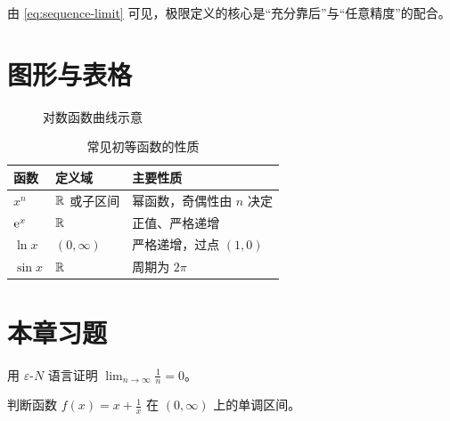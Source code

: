 由 \cref{eq:sequence-limit} 可见，极限定义的核心是“充分靠后”与“任意精度”的配合。

\section{图形与表格}

\begin{figure}[htbp]
  \centering
  \caption{对数函数曲线示意}
  \label{fig:log-curve}
\end{figure}

\begin{table}[htbp]
  \centering
  \caption{常见初等函数的性质}
  \label{tab:functions}
  \begin{tabular}{lll}
    \toprule
    函数 & 定义域 & 主要性质 \\
    \midrule
    $x^n$ & $\mathbb{R}$ 或子区间 & 幂函数，奇偶性由 $n$ 决定 \\
    $\mathrm{e}^x$ & $\mathbb{R}$ & 正值、严格递增 \\
    $\ln x$ & $(0,\infty)$ & 严格递增，过点 $(1,0)$ \\
    $\sin x$ & $\mathbb{R}$ & 周期为 $2\pi$ \\
    \bottomrule
  \end{tabular}
\end{table}

\section{本章习题}

\begin{exercise}
用 $\varepsilon$-$N$ 语言证明 $\lim_{n\to\infty}\frac{1}{n}=0$。
\end{exercise}

\begin{exercise}
判断函数 $f(x)=x+\frac{1}{x}$ 在 $(0,\infty)$ 上的单调区间。
\end{exercise}

